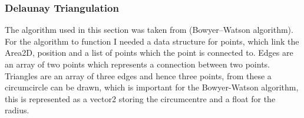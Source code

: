 \documentclass{article}
\newcommand{\parBr}{\vspace{5mm}}%
\newcommand{\smallBr}{\vspace{1.5mm}}
\begin{document}
\subsubsection{Delaunay Triangulation}
The algorithm used in this section was taken from \cite{BW_alg}(Bowyer–Watson algorithm). For the algorithm to function I needed a data structure for points, which link the Area2D, position and a list of points which the point is connected to. Edges are an array of two points which represents a connection between two points. Triangles are an array of three edges and hence three points, from these a circumcircle can be drawn, which is important for the Bowyer-Watson algorithm, this is represented as a vector2 storing the circumcentre and a float for the radius.
\linebreak
\begin{figure}
\begin{center}

\parBr


\parBr


\end{center}
\end{figure}
\end{document}

